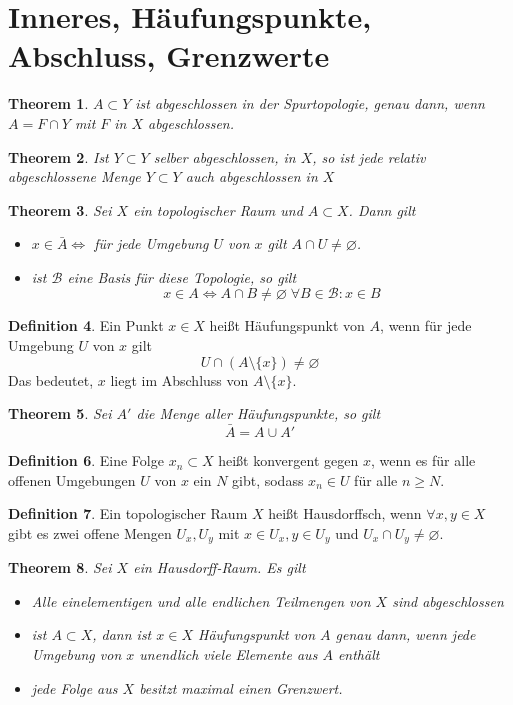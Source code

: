 \documentclass[a4paper, 12pt]{article}
\theoremstyle{plain}
\newtheorem{theorem}{Theorem}[section] %
\theoremstyle{definition}
\newtheorem{definition}[theorem]{Definition} %
\theoremstyle{lemma}
\theoremstyle{remark}
\theoremstyle{corollary}
\theoremstyle{example}
\begin{document}
	\section{Inneres, Häufungspunkte, Abschluss, Grenzwerte}
	\begin{theorem}
		$A\subset Y$ ist abgeschlossen in der Spurtopologie, genau dann, wenn $A = F \cap Y$ mit $F$ in $X$ abgeschlossen.
	\end{theorem}
	\begin{theorem}
		Ist $Y\subset Y$ selber abgeschlossen, in $X$, so ist jede relativ abgeschlossene Menge $Y\subset Y$ auch abgeschlossen in $X$
	\end{theorem}
	\begin{theorem}
		Sei $X$ ein topologischer Raum und $A \subset X$. Dann gilt \begin{itemize}
			\item $x \in \bar{A} \Leftrightarrow $ für jede Umgebung $U$ von $x$ gilt $A \cap U \neq \varnothing$.
			\item ist $\mathcal{B}$ eine Basis für diese Topologie, so gilt \[x \in A \Leftrightarrow A \cap B \neq \varnothing \; \forall B \in \mathcal{B}: x \in B\]
		\end{itemize}
	\end{theorem}
	\begin{definition}
		Ein Punkt $x \in X$ heißt Häufungspunkt von $A$, wenn für jede Umgebung $U$ von $x$ gilt \[U \cap (A \setminus \{x\}) \neq \varnothing\] Das bedeutet, $x$ liegt im Abschluss von $A \setminus \{x\}$.	
	\end{definition}
	\begin{theorem}
		Sei $A'$ die Menge aller Häufungspunkte, so gilt \[\bar{A} = A \cup A'\]
	\end{theorem}
	\begin{definition}
		Eine Folge $x_n \subset X$ heißt konvergent gegen $x$, wenn es für alle offenen Umgebungen $U$ von $x$ ein $N$ gibt, sodass $x_n \in U$ für alle $n \geq N$. 
	\end{definition}
	\begin{definition}
		Ein topologischer Raum $X$ heißt Hausdorffsch, wenn $\forall x,y \in X$ gibt es zwei offene Mengen $U_x, U_y$ mit $x \in U_x, y \in U_y$ und $U_x \cap U_y \neq \varnothing$.
	\end{definition}
	\begin{theorem}
		Sei $X$ ein Hausdorff-Raum. Es gilt \begin{itemize}
			\item Alle einelementigen und alle endlichen Teilmengen von $X$ sind abgeschlossen
			\item ist $A \subset X$, dann ist $x \in X$ Häufungspunkt von $A$ genau dann, wenn jede Umgebung von $x$ unendlich viele Elemente aus $A$ enthält
			\item jede Folge aus $X$ besitzt maximal einen Grenzwert.
		\end{itemize}
	\end{theorem}
\end{document}
